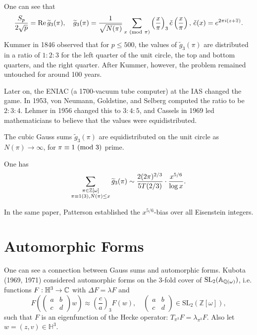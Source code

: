 \begin{remark}
  One can see that
  \[
    \frac{S_p}{2\sqrt{p}}
     = \operatorname{Re} \widetilde{g}_3(\pi), \quad
     \widetilde{g}_3(\pi) = \frac{1}{\sqrt{N(\pi)}} \sum_{x \ (\mathrm{mod}\ \pi)} \left(\frac{x}{\pi}\right)_3 \check{e}\left(\frac{x}{\pi}\right),\, \check{e}(x) = e^{2\pi i (z + \overline{z})}.
  \]
  Kummer in 1846 observed that for $p \le 500$,
  the values of $\widetilde{g}_3(\pi)$
  are distributed in a ratio of $1 : 2 : 3$
  for the left quarter of the unit circle,
  the top and bottom quarters, and the right quarter.
  After Kummer, however, the problem remained
  untouched for around 100 years.

  Later on, the ENIAC (a 1700-vacuum tube
  computer) at the IAS changed the game.
  In 1953, von Neumann, Goldstine, and Selberg
  computed the ratio to be $2 : 3 : 4$.
  Lehmer in 1956 changed this to $3 : 4 : 5$,
  and Cassels in 1969 led mathematicians
  to believe that the values were equidistributed.
\end{remark}

\begin{conjecture}[Folklore]
  The cubic Gauss sums $\widetilde{g}_3(\pi)$
  are equidistributed on the unit circle
  as $N(\pi) \to \infty$, for
  $\pi \equiv 1 \ (\mathrm{mod}\ 3)$ prime.
\end{conjecture}

\begin{conjecture}[Patterson, 1978]
  One has
  \[
    \sum_{\substack{\pi \in \mathbb{Z}[\omega] \\ \pi \equiv 1 (3), N(\pi) \le x}} \widetilde{g}_3(\pi)
    \sim \frac{2(2\pi)^{2 / 3}}{5T(2 / 3)} \cdot \frac{x^{5 / 6}}{\log x}.
  \]
\end{conjecture}

\begin{remark}
  In the same paper, Patterson established
  the $x^{5 / 6}$-bias over all Eisenstein
  integers.
\end{remark}

\section{Automorphic Forms}

\begin{remark}
  One can see a connection between
  Gauss sums and automorphic forms. Kubota
  (1969, 1971) considered
  automorphic forms on the $3$-fold cover
  of $\mathrm{SL}_2(\mathbb{A}_{\mathbb{Q}(\omega)})$,
  i.e. functions $F : \mathbb{H}^3 \to \mathbb{C}$
  with $\Delta F = \lambda F$ and
  \[
    F\left(
      \begin{pmatrix}
        a & b \\
        c & d
      \end{pmatrix} w
    \right)
    \approx \left(\frac{c}{a}\right)_3 F(w), \quad
    \begin{pmatrix}
      a & b \\
      c & d
    \end{pmatrix} \in \mathrm{SL}_2(\mathbb{Z}[\omega]),
  \]
  such that $F$ is an eigenfunction
  of the Hecke operator:
  $T_{\pi^3} F = \lambda_{\pi^3} F$.
  Also let $w = (z, v) \in \mathbb{H}^3$.
\end{remark}

